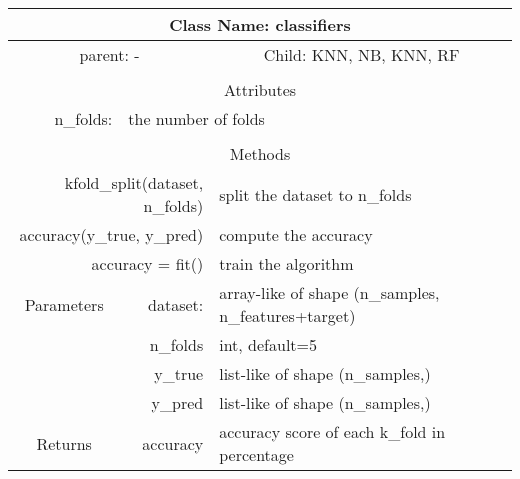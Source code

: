 {\small
\begin{tabular}{llll}
\toprule
\multicolumn{4}{|c|}{Class Name: classifiers} \\
\midrule
\multicolumn{2}{|c|}{parent: -} &\multicolumn{2}{|c|}{Child: KNN, NB, KNN, RF} \\\bottomrule


\multicolumn{4}{c}{} \\\bottomrule
\multicolumn{4}{|c|}{Attributes} \\\midrule
\multicolumn{1}{|r}{n\_folds: } & \multicolumn{3}{l|}{the number of folds } \\\bottomrule



\multicolumn{4}{c}{} \\\bottomrule
\multicolumn{4}{|c|}{Methods} \\\midrule
\multicolumn{2}{|r}{kfold\_split(dataset, n\_folds) } & \multicolumn{2}{l|}{split the dataset to n\_folds} \\
\multicolumn{2}{|r}{accuracy(y\_true, y\_pred) } & \multicolumn{2}{l|}{compute the accuracy} \\
\multicolumn{2}{|r}{accuracy = fit() } & \multicolumn{2}{l|}{train the algorithm} \\\midrule


\multicolumn{1}{|c|}{Parameters}
& \multicolumn{1}{|r}{dataset:}& \multicolumn{2}{l|}{array-like of shape (n\_samples, n\_features+target)}\\
\multicolumn{1}{|l|}{} & \multicolumn{1}{|r}{n\_folds}& \multicolumn{2}{l|}{int, default=5}\\
\multicolumn{1}{|l|}{} & \multicolumn{1}{|r}{y\_true}& \multicolumn{2}{l|}{list-like of shape (n\_samples,)}\\
\multicolumn{1}{|l|}{} & \multicolumn{1}{|r}{y\_pred}& \multicolumn{2}{l|}{list-like of shape (n\_samples,)}\\\midrule

\multicolumn{1}{|c|}{Returns} & \multicolumn{1}{|r}{accuracy}& \multicolumn{2}{l|}{accuracy score of each k\_fold in percentage}\\




\bottomrule
\end{tabular}}